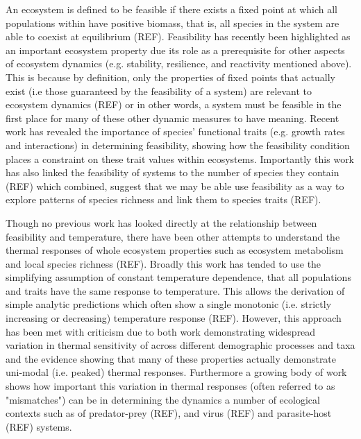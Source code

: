 \documentclass{article}
\begin{document}
An ecosystem is defined to be feasible if there exists a fixed point at which all populations within have positive biomass, that is, all species in the system are able to coexist at equilibrium (REF). Feasibility has recently been highlighted as an important ecosystem property due its role as a prerequisite for other aspects of ecosystem dynamics (e.g. stability, resilience, and reactivity mentioned above). This is because by definition, only the properties of fixed points that actually exist (i.e those guaranteed by the feasibility of a system) are relevant to ecosystem dynamics (REF) or in other words, a system must be feasible in the first place for many of these other dynamic measures to have meaning. Recent work has revealed the importance of species' functional traits (e.g. growth rates and interactions) in determining feasibility, showing how the feasibility condition places a constraint on these trait values within ecosystems. Importantly this work has also linked the feasibility of systems to the number of species they contain (REF) which combined, suggest that we may be able use feasibility as a way to explore patterns of species richness and link them to species traits (REF). 

Though no previous work has looked directly at the relationship between feasibility and temperature, there have been other attempts to understand the thermal responses of whole ecosystem properties such as ecosystem metabolism and local species richness (REF). Broadly this work has tended to use the simplifying assumption of constant temperature dependence, that all populations and traits have the same response to temperature. This allows the derivation of simple analytic predictions which often show a single monotonic (i.e. strictly increasing or decreasing) temperature response (REF). However, this approach has been met with criticism due to both work demonstrating widespread variation in thermal sensitivity of across different demographic processes and taxa and the evidence showing that many of these properties actually demonstrate uni-modal (i.e. peaked) thermal responses. Furthermore a growing body of work shows how important this variation in thermal responses (often referred to as "mismatches") can be in determining the dynamics a number of ecological contexts such as of predator-prey (REF), and virus (REF) and parasite-host (REF)  systems.  
\end{document}
